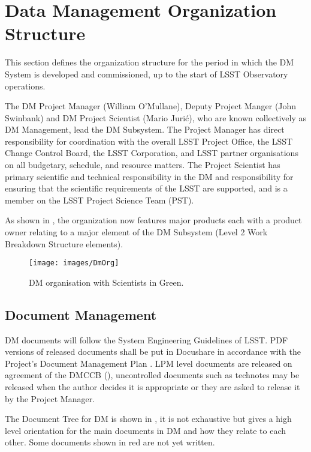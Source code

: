 \section{Data Management Organization Structure}

This section defines the organization structure for the period in which the DM System is developed and commissioned, up to the start of LSST Observatory operations.

The DM Project Manager (William O'Mullane), Deputy Project Manger (John Swinbank) and DM Project Scientist (Mario Juri\'c), who are known collectively as DM Management, lead the DM Subsystem.
The Project Manager has direct responsibility for coordination with the overall LSST Project Office, the LSST Change Control Board, the LSST Corporation, and LSST partner organisations on all budgetary, schedule, and resource matters.
The Project Scientist has primary scientific and technical responsibility in the DM and responsibility for ensuring that the scientific requirements of the LSST are supported, and is a member on the LSST Project Science Team (PST).

As shown in , the organization now features  major products  each with a product owner
relating to a major element of the DM Subsystem (Level 2 Work Breakdown Structure elements).

\begin{figure}[htbp]
\begin{center}
 \texttt{[image: images/DmOrg]}
\caption{DM organisation with Scientists in Green. \label{fig:dmorg}}
\end{center}
\end{figure}


\subsection {Document Management} \label{sect:docman}

DM documents will follow the System Engineering Guidelines of LSST. PDF versions of released documents shall be put in Docushare in accordance with the Project's Document Management Plan . LPM level documents are released on agreement of the DMCCB (), uncontrolled documents such as technotes may be released when the author decides it is appropriate or they are asked to release it by the Project Manager. 

The Document Tree for DM is shown in , it is not exhaustive but gives a high level orientation for the main documents in DM and how they relate to each other. Some documents shown in red are not yet written.

